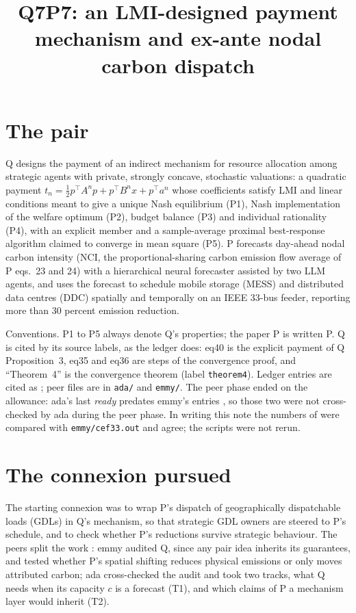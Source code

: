 \documentclass{article}
\title{Q7P7: an LMI-designed payment mechanism and ex-ante nodal carbon dispatch}
\begin{document}
\maketitle

\section{The pair}

Q designs the payment of an indirect mechanism for resource allocation among strategic agents with private, strongly concave, stochastic valuations: a quadratic payment \(t_n=\tfrac12p^\top A^np+p^\top B^nx+p^\top a^n\) whose coefficients satisfy LMI and linear conditions meant to give a unique Nash equilibrium (P1), Nash implementation of the welfare optimum (P2), budget balance (P3) and individual rationality (P4), with an explicit member and a sample-average proximal best-response algorithm claimed to converge in mean square (P5).
P forecasts day-ahead nodal carbon intensity (NCI, the proportional-sharing carbon emission flow average of P eqs.~23 and 24) with a hierarchical neural forecaster assisted by two LLM agents, and uses the forecast to schedule mobile storage (MESS) and distributed data centres (DDC) spatially and temporally on an IEEE 33-bus feeder, reporting more than 30 percent emission reduction.

Conventions. P1 to P5 always denote Q's properties; the paper P is written P. Q is cited by its source labels, as the ledger does: eq40 is the explicit payment of Q Proposition~3, eq35 and eq36 are steps of the convergence proof, and ``Theorem~4'' is the convergence theorem (label \texttt{theorem4}). Ledger entries are cited as ; peer files are in \texttt{ada/} and \texttt{emmy/}. The peer phase ended on the allowance: ada's last \emph{ready}  predates emmy's entries , so those two were not cross-checked by ada during the peer phase. In writing this note the numbers of  were compared with \texttt{emmy/cef33.out} and agree; the scripts were not rerun.

\section{The connexion pursued}

The starting connexion was to wrap P's dispatch of geographically dispatchable loads (GDLs) in Q's mechanism, so that strategic GDL owners are steered to P's schedule, and to check whether P's reductions survive strategic behaviour. The peers split the work : emmy audited Q, since any pair idea inherits its guarantees, and tested whether P's spatial shifting reduces physical emissions or only moves attributed carbon; ada cross-checked the audit and took two tracks, what Q needs when its capacity \(c\) is a forecast (T1), and which claims of P a mechanism layer would inherit (T2).
\end{document}
